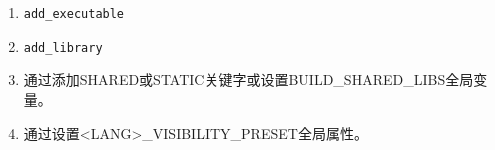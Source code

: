 

\begin{enumerate}
\item 
\begin{lstlisting}[style=styleCMake]
add_executable
\end{lstlisting}

\item 
\begin{lstlisting}[style=styleCMake]
add_library
\end{lstlisting}

\item 
通过添加SHARED或STATIC关键字或设置BUILD\_SHARED\_LIBS全局变量。

\item 
通过设置<LANG>\_VISIBILITY\_PRESET全局属性。
\end{enumerate}